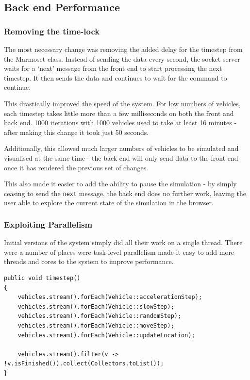 \documentclass[ %
                    author={Alexander Hill},
                supervisor={Dr. Benjamin Sach},
                    degree={MEng},
                     title={MARMOSET},
                  subtitle={Multi-Agent Route Management using Online Simulation for Efficient Transportation},
                      type={research},
                      year={2016} ]{dissertation}
\begin{document}
\subsection{Back end Performance}

\subsubsection{Removing the time-lock}

The most necessary change was removing the added delay for the timestep from the
Marmoset class. Instead of sending the data every second, the socket server
waits for a `next' message from the front end to start processing the next
timestep. It then sends the data and continues to wait for the command to
continue.

This drastically improved the speed of the system. For low numbers of vehicles,
each timestep takes little more than a few milliseconds on both the front and
back end. 1000 iterations with 1000 vehicles used to take at least 16 minutes -
after making this change it took just 50 seconds.

Additionally, this allowed much larger numbers of vehicles to be simulated and
visualised at the same time - the back end will only send data to the front end
once it has rendered the previous set of changes.

This also made it easier to add the ability to pause the simulation - by simply
ceasing to send the \texttt{next} message, the back end does no further work,
leaving the user able to explore the current state of the simulation in the
browser.

\subsubsection{Exploiting Parallelism}

Initial versions of the system simply did all their work on a single thread.
There were a number of places were task-level parallelism made it easy to add
more threads and cores to the system to improve performance.

\begin{minipage}{\linewidth}
\begin{lstlisting}[caption={The single-threaded \texttt{timestep} function},
    label=lst:timestep]
public void timestep()
{
    vehicles.stream().forEach(Vehicle::accelerationStep);
    vehicles.stream().forEach(Vehicle::slowStep);
    vehicles.stream().forEach(Vehicle::randomStep);
    vehicles.stream().forEach(Vehicle::moveStep);
    vehicles.stream().forEach(Vehicle::updateLocation);

    vehicles.stream().filter(v -> !v.isFinished()).collect(Collectors.toList());
}
\end{lstlisting}
\end{minipage}
\end{document}
